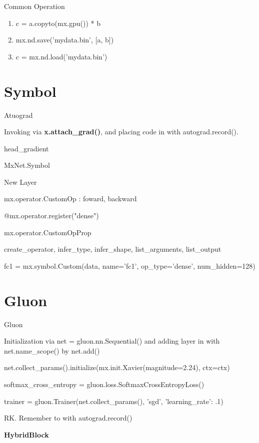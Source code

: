\documentclass[english, nochinese]{../TeXTemplate/pkuslide}
\begin{document}
\begin{frame}{Common Operation}
\begin{enumerate}
    \item  c = a.copyto(mx.gpu()) * b
    \item mx.nd.save('mydata.bin', [a, b])  
    \item c = mx.nd.load('mydata.bin') 
    
\end{enumerate}
\end{frame}


\section{Symbol}

\begin{frame}{Atuograd}

Invoking via \textbf{x.attach_grad()}, and placing code in with autograd.record().

head\_gradient

MxNet.Symbol

\end{frame}

\begin{frame}{New Layer}

mx.operator.CustomOp : foward, backward

@mx.operator.register("dense")  

mx.operator.CustomOpProp

create_operator, infer_type, infer_shape, list_arguments, list_output

fc1 = mx.symbol.Custom(data, name='fc1', op_type='dense', num_hidden=128)

\end{frame}

\section{Gluon}

\begin{frame}{Gluon}

Initialization via net = gluon.nn.Sequential() and adding layer in with net.name_scope() by net.add()

net.collect_params().initialize(mx.init.Xavier(magnitude=2.24), ctx=ctx)

softmax_cross_entropy = gluon.loss.SoftmaxCrossEntropyLoss()


trainer = gluon.Trainer(net.collect_params(), 'sgd', {'learning_rate': .1})

RK. Remember to with autograd.record()

\textbf{HybridBlock}
\end{frame}
\end{document}
